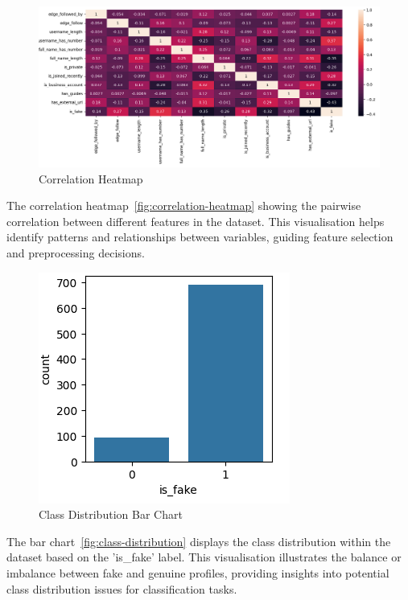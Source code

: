 \documentclass[conference]{IEEEtran}
\begin{document}
\begin{figure}[h]
	\begin{center}
		\includegraphics[scale=0.2]{correlation-heatmap}
		\caption{Correlation Heatmap}\label{fig:correlation-heatmap}
	\end{center}
\end{figure}

The correlation heatmap~\autoref{fig:correlation-heatmap} showing the pairwise correlation between different features in the dataset. This visualisation helps identify patterns and relationships between variables, guiding feature selection and preprocessing decisions.

\begin{figure}[h]
	\begin{center}
		\includegraphics[scale=0.2]{class-distribution}
		\caption{Class Distribution Bar Chart}\label{fig:class-distribution}
	\end{center}
\end{figure}

The bar chart~\autoref{fig:class-distribution} displays the class distribution within the dataset based on the 'is_fake' label. This visualisation illustrates the balance or imbalance between fake and genuine profiles, providing insights into potential class distribution issues for classification tasks.
\end{document}
